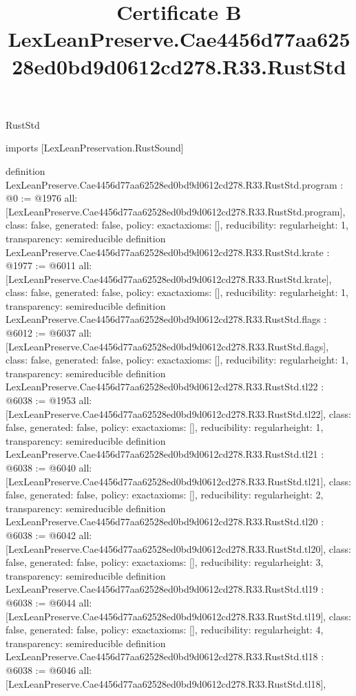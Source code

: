 \begin{lexlean}{RustStd}
\title{Certificate B LexLeanPreserve.Cae4456d77aa62528ed0bd9d0612cd278.R33.RustStd}
\begin{coremodule}
imports [LexLeanPreservation.RustSound]

definition LexLeanPreserve.Cae4456d77aa62528ed0bd9d0612cd278.R33.RustStd.program : @0 := @1976 {
  all: [LexLeanPreserve.Cae4456d77aa62528ed0bd9d0612cd278.R33.RustStd.program],
  class: false,
  generated: false,
  policy: exact{axioms: []},
  reducibility: regular{height: 1},
  transparency: semireducible
}
definition LexLeanPreserve.Cae4456d77aa62528ed0bd9d0612cd278.R33.RustStd.krate : @1977 := @6011 {
  all: [LexLeanPreserve.Cae4456d77aa62528ed0bd9d0612cd278.R33.RustStd.krate],
  class: false,
  generated: false,
  policy: exact{axioms: []},
  reducibility: regular{height: 1},
  transparency: semireducible
}
definition LexLeanPreserve.Cae4456d77aa62528ed0bd9d0612cd278.R33.RustStd.flags : @6012 := @6037 {
  all: [LexLeanPreserve.Cae4456d77aa62528ed0bd9d0612cd278.R33.RustStd.flags],
  class: false,
  generated: false,
  policy: exact{axioms: []},
  reducibility: regular{height: 1},
  transparency: semireducible
}
definition LexLeanPreserve.Cae4456d77aa62528ed0bd9d0612cd278.R33.RustStd.tl22 : @6038 := @1953 {
  all: [LexLeanPreserve.Cae4456d77aa62528ed0bd9d0612cd278.R33.RustStd.tl22],
  class: false,
  generated: false,
  policy: exact{axioms: []},
  reducibility: regular{height: 1},
  transparency: semireducible
}
definition LexLeanPreserve.Cae4456d77aa62528ed0bd9d0612cd278.R33.RustStd.tl21 : @6038 := @6040 {
  all: [LexLeanPreserve.Cae4456d77aa62528ed0bd9d0612cd278.R33.RustStd.tl21],
  class: false,
  generated: false,
  policy: exact{axioms: []},
  reducibility: regular{height: 2},
  transparency: semireducible
}
definition LexLeanPreserve.Cae4456d77aa62528ed0bd9d0612cd278.R33.RustStd.tl20 : @6038 := @6042 {
  all: [LexLeanPreserve.Cae4456d77aa62528ed0bd9d0612cd278.R33.RustStd.tl20],
  class: false,
  generated: false,
  policy: exact{axioms: []},
  reducibility: regular{height: 3},
  transparency: semireducible
}
definition LexLeanPreserve.Cae4456d77aa62528ed0bd9d0612cd278.R33.RustStd.tl19 : @6038 := @6044 {
  all: [LexLeanPreserve.Cae4456d77aa62528ed0bd9d0612cd278.R33.RustStd.tl19],
  class: false,
  generated: false,
  policy: exact{axioms: []},
  reducibility: regular{height: 4},
  transparency: semireducible
}
definition LexLeanPreserve.Cae4456d77aa62528ed0bd9d0612cd278.R33.RustStd.tl18 : @6038 := @6046 {
  all: [LexLeanPreserve.Cae4456d77aa62528ed0bd9d0612cd278.R33.RustStd.tl18],
}
\end{coremodule}
\end{lexlean}
